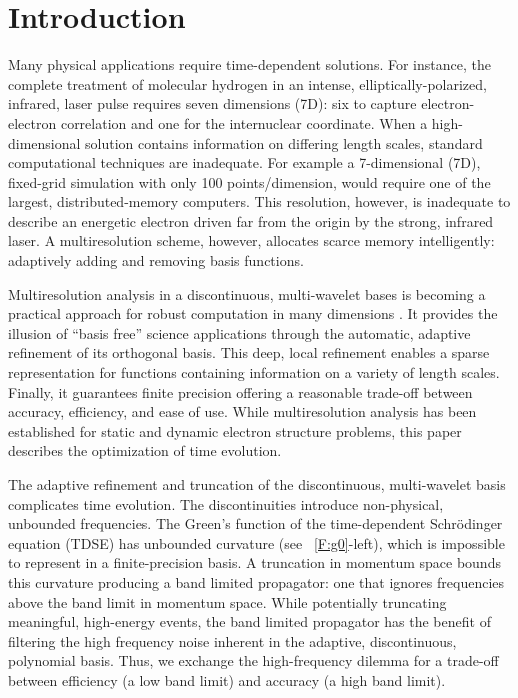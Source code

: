 \documentclass[review,letterpaper]{elsarticle}
\begin{document}
\section{Introduction}
Many physical applications require time-dependent solutions.
For instance, the complete treatment of molecular hydrogen in an intense, elliptically-polarized, infrared, laser pulse requires seven dimensions (7D): six to capture electron-electron correlation and one for the internuclear coordinate.
When a high-dimensional solution contains information on differing length scales, standard computational techniques are inadequate.
For example a 7-dimensional (7D), fixed-grid simulation with only 100 points/dimension, would require one of the largest, distributed-memory computers.
This resolution, however, is inadequate to describe an energetic electron driven far from the origin by the strong, infrared laser.
A multiresolution scheme, however, allocates scarce memory intelligently:
adaptively adding and removing basis functions.

Multiresolution analysis in a discontinuous, multi-wavelet bases is becoming a practical
approach for robust computation in many dimensions \cite{Alpert:1990,A-B-G-V:2002,ibmpaper,mrqc1}.
It provides the illusion of ``basis free'' science applications through the automatic,
adaptive refinement of its orthogonal basis.
This deep, local refinement enables a sparse representation
for functions containing information on a variety of length scales.
Finally, it guarantees finite precision offering a reasonable trade-off between
accuracy, efficiency, and ease of use.
While multiresolution analysis has been established for static \cite{mrqc1}
and dynamic \cite{Vence:2012iy} electron structure problems,
this paper describes the optimization of time evolution.

The adaptive refinement and truncation of the discontinuous, multi-wavelet basis complicates time evolution.
The discontinuities introduce non-physical, unbounded frequencies.
The Green's function of the time-dependent
Schr\"odinger equation (TDSE) has unbounded curvature (see \figurename~\ref{F:g0}-left),
which is impossible to represent in a finite-precision basis. A truncation in momentum space
bounds this curvature producing a band limited propagator: one that ignores frequencies above
the band limit in momentum space. While potentially truncating meaningful, high-energy events, the band limited
propagator has the benefit of filtering the high frequency noise inherent in the adaptive,
discontinuous, polynomial basis. Thus, we exchange the high-frequency dilemma for a trade-off
between efficiency (a low band limit) and accuracy (a high band limit).
\end{document}
